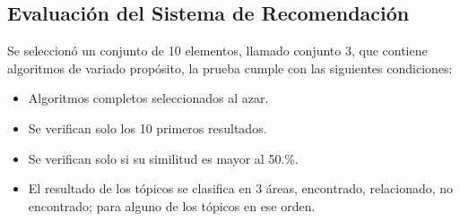 


\subsection{Evaluación del Sistema de Recomendación}

Se seleccionó un conjunto de 10 elementos, llamado conjunto 3,
que contiene algoritmos de variado propósito,
la prueba cumple con las siguientes condiciones:

\begin{itemize}
	\item Algoritmos completos seleccionados al azar.
	\item Se verifican solo los 10 primeros resultados.
	\item Se verifican solo si su similitud es mayor al 50.\%.
	\item El resultado de los tópicos se clasifica en 3 áreas, encontrado, relacionado, no encontrado;
	para alguno de los tópicos en ese orden.
\end{itemize}

